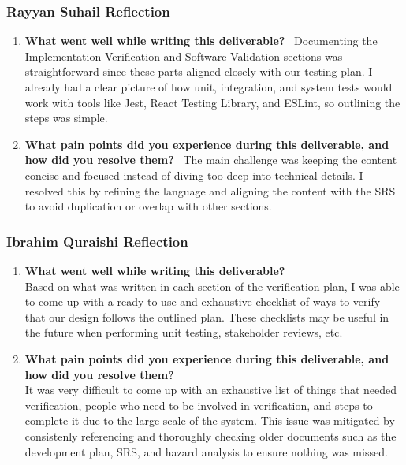 \documentclass[12pt, titlepage]{article}
\begin{document}
\subsubsection*{Rayyan Suhail Reflection}
\begin{enumerate}
\item \textbf{What went well while writing this deliverable?} \
Documenting the Implementation Verification and Software Validation sections was straightforward since these parts aligned closely with our testing plan. I already had a clear picture of how unit, integration, and system tests would work with tools like Jest, React Testing Library, and ESLint, so outlining the steps was simple.

\item \textbf{What pain points did you experience during this deliverable, and how did you resolve them?} \
The main challenge was keeping the content concise and focused instead of diving too deep into technical details. I resolved this by refining the language and aligning the content with the SRS to avoid duplication or overlap with other sections.
\end{enumerate}

\subsubsection*{Ibrahim Quraishi Reflection}
\begin{enumerate}
  \item \textbf{What went well while writing this deliverable?} \\
  Based on what was written in each section of the verification plan, I was able to come up with a ready to use and exhaustive checklist of ways to verify that our design follows the outlined plan. These checklists may be useful in the future when performing unit testing, stakeholder reviews, etc.
  \item \textbf{What pain points did you experience during this deliverable, and how did you resolve them?} \\
  It was very difficult to come up with an exhaustive list of things that needed verification, people who need to be involved in verification, and steps to complete it due to the large scale of the system. This issue was mitigated by consistenly referencing and thoroughly checking older documents such as the development plan, SRS, and hazard analysis to ensure nothing was missed. 
\end{enumerate}
\end{document}
